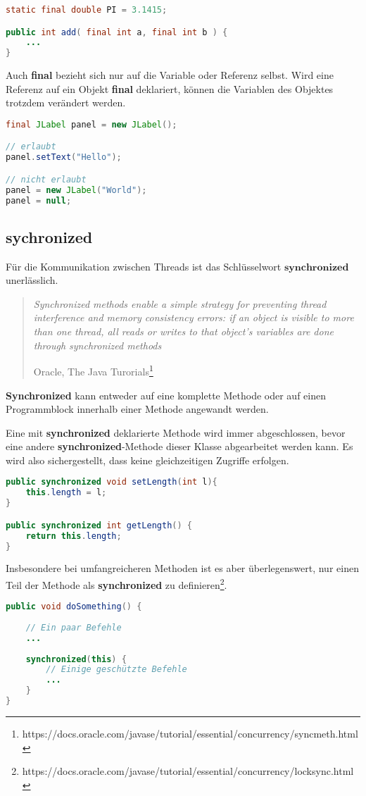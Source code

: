 \begin{lstlisting}[language=JAVA]
static final double PI = 3.1415;

public int add( final int a, final int b ) {
	...
}
\end{lstlisting}

Auch \textbf{final} bezieht sich nur auf die Variable oder Referenz selbst. Wird eine Referenz auf ein Objekt \textbf{final} deklariert, können die Variablen des Objektes trotzdem verändert werden.

\begin{lstlisting}[language=JAVA]
final JLabel panel = new JLabel();

// erlaubt
panel.setText("Hello");

// nicht erlaubt
panel = new JLabel("World");
panel = null;
\end{lstlisting}

\subsection*{sychronized}
Für die Kommunikation zwischen Threads ist das Schlüsselwort $\textbf{synchronized}$ unerlässlich. 
\begin{quote}
\emph{Synchronized methods enable a simple strategy for preventing thread interference and memory consistency errors: if an object is visible to more than one thread, all reads or writes to that object's variables are done through synchronized methods}
\begin{flushright}Oracle, The Java Turorials\footnote{https://docs.oracle.com/javase/tutorial/essential/concurrency/syncmeth.html}\end{flushright}
\end{quote}
\textbf{Synchronized} kann entweder auf eine komplette Methode oder auf einen Programmblock innerhalb einer Methode angewandt werden.

Eine mit \textbf{synchronized} deklarierte Methode wird immer abgeschlossen, bevor eine andere \textbf{synchronized}-Methode dieser Klasse abgearbeitet werden kann. Es wird also sichergestellt, dass keine gleichzeitigen Zugriffe erfolgen.
\begin{lstlisting}[language=JAVA]
public synchronized void setLength(int l){
	this.length = l;
}

public synchronized int getLength() {
	return this.length;
}
\end{lstlisting}

Insbesondere bei umfangreicheren Methoden ist es aber überlegenswert, nur einen Teil der Methode als \textbf{synchronized} zu definieren\footnote{https://docs.oracle.com/javase/tutorial/essential/concurrency/locksync.html}.
\begin{lstlisting}[language=JAVA]
public void doSomething() {
	
	// Ein paar Befehle
	...
	
	synchronized(this) {
		// Einige geschützte Befehle
		...
	}
}
\end{lstlisting}

